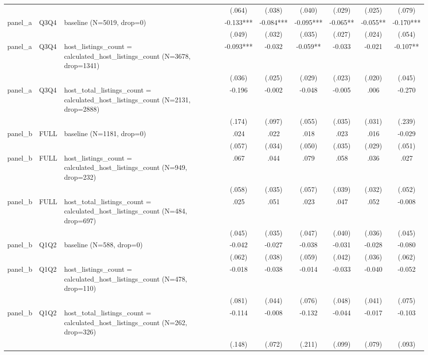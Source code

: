 \begin{tabular}{lllcccccc}
\\
 &  &  & (.064) & (.038) & (.040) & (.029) & (.025) & (.079)
\\
panel\_a & Q3Q4 & baseline (N=5019, drop=0) & -0.133*** & -0.084*** & -0.095*** & -0.065** & -0.055** & -0.170***
\\
 &  &  & (.049) & (.032) & (.035) & (.027) & (.024) & (.054)
\\
panel\_a & Q3Q4 & host\_listings\_count = calculated\_host\_listings\_count (N=3678, drop=1341) & -0.093*** & -0.032 & -0.059** & -0.033 & -0.021 & -0.107**
\\
 &  &  & (.036) & (.025) & (.029) & (.023) & (.020) & (.045)
\\
panel\_a & Q3Q4 & host\_total\_listings\_count = calculated\_host\_listings\_count (N=2131, drop=2888) & -0.196 & -0.002 & -0.048 & -0.005 & .006 & -0.270
\\
 &  &  & (.174) & (.097) & (.055) & (.035) & (.031) & (.239)
\\
panel\_b & FULL & baseline (N=1181, drop=0) & .024 & .022 & .018 & .023 & .016 & -0.029
\\
 &  &  & (.057) & (.034) & (.050) & (.035) & (.029) & (.051)
\\
panel\_b & FULL & host\_listings\_count = calculated\_host\_listings\_count (N=949, drop=232) & .067 & .044 & .079 & .058 & .036 & .027
\\
 &  &  & (.058) & (.035) & (.057) & (.039) & (.032) & (.052)
\\
panel\_b & FULL & host\_total\_listings\_count = calculated\_host\_listings\_count (N=484, drop=697) & .025 & .051 & .023 & .047 & .052 & -0.008
\\
 &  &  & (.045) & (.035) & (.047) & (.040) & (.036) & (.045)
\\
panel\_b & Q1Q2 & baseline (N=588, drop=0) & -0.042 & -0.027 & -0.038 & -0.031 & -0.028 & -0.080
\\
 &  &  & (.062) & (.038) & (.059) & (.042) & (.036) & (.062)
\\
panel\_b & Q1Q2 & host\_listings\_count = calculated\_host\_listings\_count (N=478, drop=110) & -0.018 & -0.038 & -0.014 & -0.033 & -0.040 & -0.052
\\
 &  &  & (.081) & (.044) & (.076) & (.048) & (.041) & (.075)
\\
panel\_b & Q1Q2 & host\_total\_listings\_count = calculated\_host\_listings\_count (N=262, drop=326) & -0.114 & -0.008 & -0.132 & -0.044 & -0.017 & -0.103
\\
 &  &  & (.148) & (.072) & (.211) & (.099) & (.079) & (.093)

\end{tabular}
